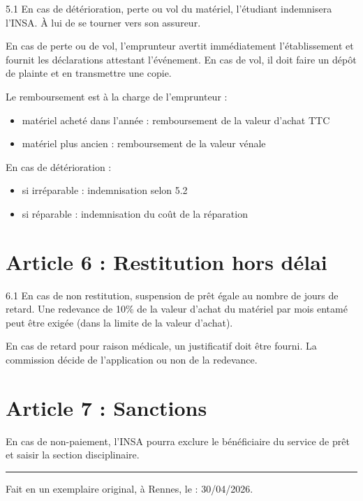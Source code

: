 \documentclass[12pt,a4paper]{article}
\begin{document}
5.1 En cas de détérioration, perte ou vol du matériel, l’étudiant indemnisera l’INSA. À lui de se tourner vers son assureur.

 En cas de perte ou de vol, l’emprunteur avertit immédiatement l’établissement et fournit les déclarations attestant l’événement.  
En cas de vol, il doit faire un dépôt de plainte et en transmettre une copie.  

Le remboursement est à la charge de l’emprunteur :
\begin{itemize}
    \item matériel acheté dans l’année : remboursement de la valeur d’achat TTC
    \item matériel plus ancien : remboursement de la valeur vénale
\end{itemize}

 En cas de détérioration :
\begin{itemize}
    \item si irréparable : indemnisation selon 5.2
    \item si réparable : indemnisation du coût de la réparation
\end{itemize}

\section*{Article 6 : Restitution hors délai}

6.1 En cas de non restitution, suspension de prêt égale au nombre de jours de retard.  
Une redevance de 10\% de la valeur d’achat du matériel par mois entamé peut être exigée (dans la limite de la valeur d’achat).

 En cas de retard pour raison médicale, un justificatif doit être fourni. La commission décide de l’application ou non de la redevance.

\section*{Article 7 : Sanctions}

En cas de non-paiement, l’INSA pourra exclure le bénéficiaire du service de prêt et saisir la section disciplinaire.

\vspace{0.5cm}
\rule{\linewidth}{1pt}
\vspace{0.5cm}

Fait en un exemplaire original, à Rennes, le : 30/04/2026.
\end{document}
